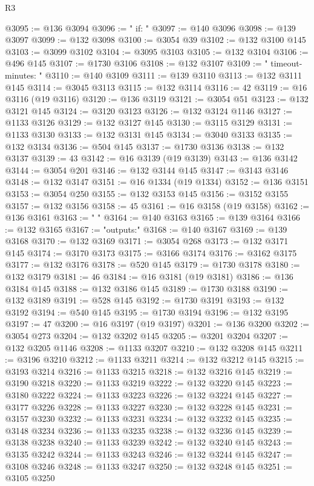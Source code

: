 \begin{lexlean}{R3}
\begin{coremodule}
@3095 := @136 @3094
@3096 := "    if: "
@3097 := @140 @3096
@3098 := @139 @3097
@3099 := @132 @3098
@3100 := @3054 @39
@3102 := @132 @3100 @145
@3103 := @3099 @3102
@3104 := @3095 @3103
@3105 := @132 @3104
@3106 := @496 @145
@3107 := @1730 @3106
@3108 := @132 @3107
@3109 := "    timeout-minutes: "
@3110 := @140 @3109
@3111 := @139 @3110
@3113 := @132 @3111 @145
@3114 := @3045 @3113
@3115 := @132 @3114
@3116 := 42
@3119 := @16 @3116 (@19 @3116)
@3120 := @136 @3119
@3121 := @3054 @51
@3123 := @132 @3121 @145
@3124 := @3120 @3123
@3126 := @132 @3124 @1146
@3127 := @1133 @3126
@3129 := @132 @3127 @145
@3130 := @3115 @3129
@3131 := @1133 @3130
@3133 := @132 @3131 @145
@3134 := @3040 @3133
@3135 := @132 @3134
@3136 := @504 @145
@3137 := @1730 @3136
@3138 := @132 @3137
@3139 := 43
@3142 := @16 @3139 (@19 @3139)
@3143 := @136 @3142
@3144 := @3054 @201
@3146 := @132 @3144 @145
@3147 := @3143 @3146
@3148 := @132 @3147
@3151 := @16 @1334 (@19 @1334)
@3152 := @136 @3151
@3153 := @3054 @250
@3155 := @132 @3153 @145
@3156 := @3152 @3155
@3157 := @132 @3156
@3158 := 45
@3161 := @16 @3158 (@19 @3158)
@3162 := @136 @3161
@3163 := "    "
@3164 := @140 @3163
@3165 := @139 @3164
@3166 := @132 @3165
@3167 := "outputs:"
@3168 := @140 @3167
@3169 := @139 @3168
@3170 := @132 @3169
@3171 := @3054 @268
@3173 := @132 @3171 @145
@3174 := @3170 @3173
@3175 := @3166 @3174
@3176 := @3162 @3175
@3177 := @132 @3176
@3178 := @520 @145
@3179 := @1730 @3178
@3180 := @132 @3179
@3181 := 46
@3184 := @16 @3181 (@19 @3181)
@3186 := @136 @3184 @145
@3188 := @132 @3186 @145
@3189 := @1730 @3188
@3190 := @132 @3189
@3191 := @528 @145
@3192 := @1730 @3191
@3193 := @132 @3192
@3194 := @540 @145
@3195 := @1730 @3194
@3196 := @132 @3195
@3197 := 47
@3200 := @16 @3197 (@19 @3197)
@3201 := @136 @3200
@3202 := @3054 @273
@3204 := @132 @3202 @145
@3205 := @3201 @3204
@3207 := @132 @3205 @1146
@3208 := @1133 @3207
@3210 := @132 @3208 @145
@3211 := @3196 @3210
@3212 := @1133 @3211
@3214 := @132 @3212 @145
@3215 := @3193 @3214
@3216 := @1133 @3215
@3218 := @132 @3216 @145
@3219 := @3190 @3218
@3220 := @1133 @3219
@3222 := @132 @3220 @145
@3223 := @3180 @3222
@3224 := @1133 @3223
@3226 := @132 @3224 @145
@3227 := @3177 @3226
@3228 := @1133 @3227
@3230 := @132 @3228 @145
@3231 := @3157 @3230
@3232 := @1133 @3231
@3234 := @132 @3232 @145
@3235 := @3148 @3234
@3236 := @1133 @3235
@3238 := @132 @3236 @145
@3239 := @3138 @3238
@3240 := @1133 @3239
@3242 := @132 @3240 @145
@3243 := @3135 @3242
@3244 := @1133 @3243
@3246 := @132 @3244 @145
@3247 := @3108 @3246
@3248 := @1133 @3247
@3250 := @132 @3248 @145
@3251 := @3105 @3250

\end{coremodule}
\end{lexlean}
